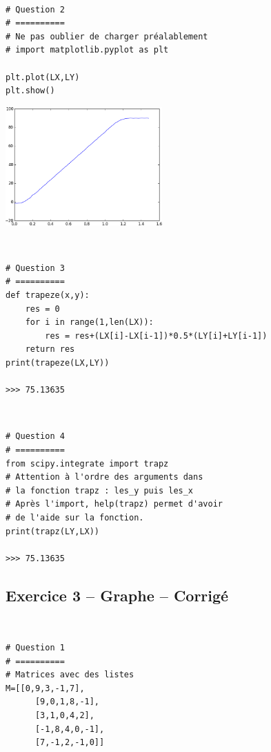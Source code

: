 \documentclass[10pt,fleqn]{article} %
\begin{document}
\begin{corrige}
$\quad$
\begin{lstlisting}
# Question 2
# ==========
# Ne pas oublier de charger préalablement 
# import matplotlib.pyplot as plt

plt.plot(LX,LY)
plt.show()
\end{lstlisting}
\end{corrige}
\begin{center}
\includegraphics[width=6cm] {images/exo_02}
\end{center}


\begin{corrige}
$\quad$
\begin{lstlisting}
# Question 3
# ==========
def trapeze(x,y):
    res = 0 
    for i in range(1,len(LX)):
        res = res+(LX[i]-LX[i-1])*0.5*(LY[i]+LY[i-1])
    return res
print(trapeze(LX,LY))

>>> 75.13635
\end{lstlisting}
\end{corrige}

\begin{corrige}
$\quad$
\begin{lstlisting}
# Question 4
# ==========
from scipy.integrate import trapz
# Attention à l'ordre des arguments dans 
# la fonction trapz : les_y puis les_x
# Après l'import, help(trapz) permet d'avoir 
# de l'aide sur la fonction.
print(trapz(LY,LX))

>>> 75.13635
\end{lstlisting}
\end{corrige}

\subsection*{Exercice 3 -- Graphe -- Corrigé}

\begin{corrige}
$\quad$
\begin{lstlisting}
# Question 1
# ==========
# Matrices avec des listes
M=[[0,9,3,-1,7],
      [9,0,1,8,-1],
      [3,1,0,4,2],
      [-1,8,4,0,-1],
      [7,-1,2,-1,0]]
\end{lstlisting}
\end{corrige}
\end{document}

